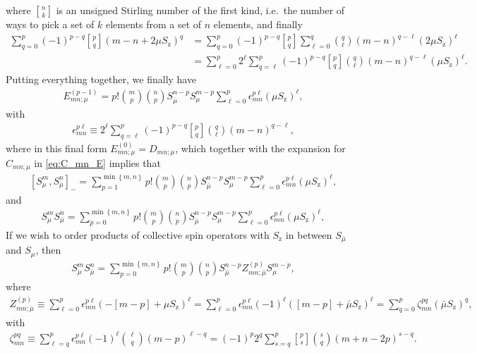 \documentclass[aps,notitlepage,nofootinbib,11pt]{revtex4-1}
\newcommand{\p}[1]{\left(#1\right)} %
\renewcommand{\sp}[1]{\left[#1\right]} %
\renewcommand{\set}[1]{\left\{#1\right\}} %
\newcommand{\z}{\text{z}}
\newcommand{\bmu}{{\bar\mu}}
\newcommand{\1}{\mathds{1}}
\begin{document}
where ${ n \brack k }$ is an unsigned Stirling number of the first
kind, i.e.~the number of ways to pick a set of $k$ elements from a set
of $n$ elements, and finally
\begin{align}
  \sum_{q=0}^p \p{-1}^{p-q} { p \brack q } \p{m-n+2\mu S_\z}^q
  &= \sum_{q=0}^p \p{-1}^{p-q} { p \brack q } \sum_{\ell=0}^q
  { q \choose \ell } \p{m-n}^{q-\ell} \p{2\mu S_\z}^\ell \\
  &= \sum_{\ell=0}^p 2^\ell \sum_{q=\ell}^p \p{-1}^{p-q}
  { p \brack q } { q \choose \ell } \p{m-n}^{q-\ell} \p{\mu S_\z}^\ell.
\end{align}
Putting everything together, we finally have
\begin{align}
  E_{mn;\mu}^{(p-1)}
  = p! { m \choose p } { n \choose p }
  S_\bmu^{n-p} S_\mu^{m-p}
  \sum_{\ell=0}^p \epsilon_{mn}^{p\ell} \p{\mu S_\z}^\ell,
\end{align}
with
\begin{align}
  \epsilon_{mn}^{p\ell}
  \equiv 2^\ell \sum_{q=\ell}^p \p{-1}^{p-q}
  { p \brack q } { q \choose \ell } \p{m-n}^{q-\ell},
\end{align}
where in this final form $E_{mn;\mu}^{(0)} = D_{mn;\mu}$, which
together with the expansion for $C_{mn;\mu}$ in \eqref{eq:C_mn_E}
implies that
\begin{align}
  \sp{S_\mu^m, S_\bmu^n}_-
  = \sum_{p=1}^{\min\set{m,n}}
  p! { m \choose p } { n \choose p } S_\bmu^{n-p} S_\mu^{m-p}
  \sum_{\ell=0}^p \epsilon_{mn}^{p\ell} \p{\mu S_\z}^\ell,
  \label{eq:comm_mu}
\end{align}
and
\begin{align}
  S_\mu^m S_\bmu^n
  = \sum_{p=0}^{\min\set{m,n}}
  p! { m \choose p } { n \choose p } S_\bmu^{n-p} S_\mu^{m-p}
  \sum_{\ell=0}^p \epsilon_{mn}^{p\ell} \p{\mu S_\z}^\ell,
  \label{eq:push_mu_bmu}
\end{align}
If we wish to order products of collective spin operators with $S_\z$
in between $S_\bmu$ and $S_\mu$, then
\begin{align}
  S_\mu^m S_\bmu^n
  = \sum_{p=0}^{\min\set{m,n}} p! { m \choose p } { n \choose p }
  S_\bmu^{n-p} Z_{mn;\bmu}^{(p)} S_\mu^{m-p},
\end{align}
where
\begin{align}
  Z_{mn;\bmu}^{(p)}
  \equiv \sum_{\ell=0}^p \epsilon_{mn}^{p\ell}
  \p{-\sp{m-p} + \mu S_\z}^\ell
  = \sum_{\ell=0}^p \epsilon_{mn}^{p\ell}
  \p{-1}^\ell \p{\sp{m-p} + \bmu S_\z}^\ell
  = \sum_{q=0}^p \zeta_{mn}^{pq} \p{\bmu S_\z}^q,
  \label{eq:Z_mnp}
\end{align}
with
\begin{align}
  \zeta_{mn}^{pq}
  \equiv \sum_{\ell=q}^p \epsilon_{mn}^{p\ell} \p{-1}^\ell
  { \ell \choose q } \p{m-p}^{\ell-q}
  = \p{-1}^p 2^q \sum_{s=q}^p
  { p \brack s } { s \choose q } \p{m+n-2p}^{s-q}.
  \label{eq:zeta_mnpq}
\end{align}
\end{document}
